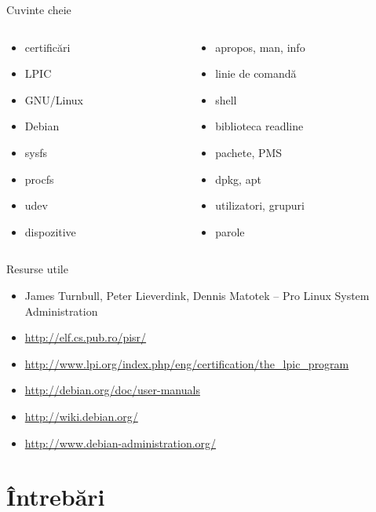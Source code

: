 \documentclass{training}
\begin{document}
\begin{frame}{Cuvinte cheie}
  \begin{columns}
    \begin{column}{0.5\textwidth}
      \begin{itemize}
        \item certificări
        \item LPIC
        \item GNU/Linux
        \item Debian
        \item sysfs
        \item procfs
        \item udev
        \item dispozitive
      \end{itemize}
    \end{column}
    \begin{column}{0.5\textwidth}
      \begin{itemize}
        \item apropos, man, info
        \item linie de comandă
        \item shell
        \item biblioteca readline
        \item pachete, PMS
        \item dpkg, apt
        \item utilizatori, grupuri
        \item parole
      \end{itemize}
    \end{column}
  \end{columns}
\end{frame}

\begin{frame}{Resurse utile}
  \begin{itemize}
    \item James Turnbull, Peter Lieverdink, Dennis Matotek -- Pro Linux System
    Administration
    \item \url{http://elf.cs.pub.ro/pisr/}
    \item
    \url{http://www.lpi.org/index.php/eng/certification/the_lpic_program}
    \item \url{http://debian.org/doc/user-manuals}
    \item \url{http://wiki.debian.org/}
    \item \url{http://www.debian-administration.org/}
  \end{itemize}
\end{frame}

\section{Întrebări}

\frame{\tableofcontents}
\end{document}
